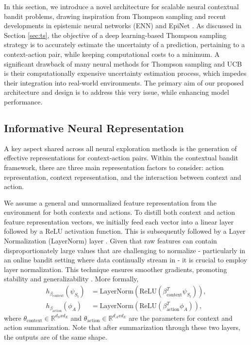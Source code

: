 In this section, we introduce a novel architecture for scalable neural contextual bandit problems, drawing inspiration from Thompson sampling and recent developments in epistemic neural networks (ENN) and EpiNet \cite{osband2021epistemic}. As discussed in Section \ref{sec:ts}, the objective of a deep learning-based Thompson sampling strategy is to accurately estimate the uncertainty of a prediction, pertaining to a context-action pair, while keeping computational costs to a minimum. A significant drawback of many neural methods for Thompson sampling and UCB is their computationally expensive uncertainty estimation process, which impedes their integration into real-world environments. The primary aim of our proposed architecture and design is to address this very issue, while enhancing model performance.

\subsection{Informative Neural Representation}
A key aspect shared across all neural exploration methods is the generation of effective representations for context-action pairs. Within the contextual bandit framework, there are three main representation factors to consider: action representation, context representation, and the interaction between context and action.

We assume a general and unnormalized feature representation from the environment for both contexts and actions. To distill both context and action feature representation vectors, we initially feed each vector into a linear layer followed by a ReLU activation function. This is subsequently followed by a Layer Normalization (LayerNorm) layer \cite{ba2016layer}. Given that raw features can contain disproportionately large values that are challenging to normalize - particularly in an online bandit setting where data continually stream in - it is crucial to employ layer normalization. This technique ensures smoother gradients, promoting stability and generalizability \cite{xu2019understanding}. More formally, 
\begin{equation}
\begin{split}
    h_{\beta_{\text{context}}}(\psi_{S_t}) &= \text{LayerNorm}(\text{ReLU}(\beta_{\text{context}}^T\psi_{S_t})),\\
    h_{\beta_{\text{action}}}(\phi_A) &= \text{LayerNorm}(\text{ReLU}(\beta_{\text{action}}^T\phi_A)),
\end{split}
\end{equation}
where $\theta_{\text{context}} \in \mathbb{R}^{d_{S} x d_{E}}$ and $\theta_{\text{action}} \in \mathbb{R}^{d_{A} x d_{E}}$ are the parameters for context and action summarization. Note that after summarization through these two layers, the outputs are of the same shape.

